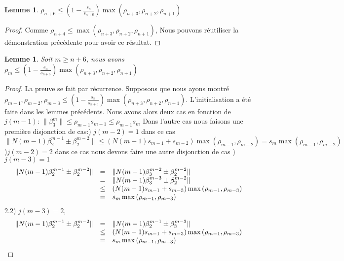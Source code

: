 \documentclass[12pt]{article}
\theoremstyle{plain}%
\newtheorem{lem}[thm]{Lemme}
\theoremstyle{definition}
\theoremstyle{remark}
\begin{document}
\begin{lem}
$\rho_{n+6} \leq (1-\frac{s_n}{s_{n+6}})\max{(\rho_{n+3},\rho_{n+2},\rho_{n+1})}$
\end{lem}
\begin{proof}
Comme $\rho_{n+4} \leq \max{(\rho_{n+3},\rho_{n+2},\rho_{n+1})}$, Nous pouvons réutiliser la démonstration précédente pour avoir ce résultat.
\end{proof}
\begin{lem}
Soit $m \geq n+6$, nous avons $\rho_m \leq (1-\frac{s_n}{s_{n+6}})\max{(\rho_{n+3},\rho_{n+2},\rho_{n+1})}$
\end{lem}
\begin{proof}
La preuve se fait par récurrence. Supposons que nous ayons montré $\rho_{m-1},\rho_{m-2},\rho_{m-3} \leq (1-\frac{s_n}{s_{n+6}})\max{(\rho_{n+3},\rho_{n+2},\rho_{n+1})}$. L'initialisation a été faite dans les lemmes précédents. Nous avons alors deux cas en fonction de $j(m-1)$: \newline
$\| \beta_3^{m} \| \leq \rho_{m-1} s_{m-1} \leq \rho_{m-1} s_m$ \newline
Dans l'autre cas nous faisons une première disjonction de cas:) $j(m-2)=1$ dans ce cas $\|N(m-1)\beta_2^{m-1} \pm \beta_2^{m-2}\| \leq (N(m-1)s_{m-1}+s_{m-2}) \max{(\rho_{m-1},\rho_{m-2})}=s_m \max{(\rho_{m-1},\rho_{m-2})}$)$j(m-2)=2$ dans ce cas nous devons faire une autre disjonction de cas )$j(m-3)=1$
\[
\begin{array}{c c l}
\|N(m-1)\beta_2^{m-1} \pm \beta_2^{m-2}\| & = & \|N(m-1)\beta_3^{m-2} \pm \beta_2^{m-2}\| \\
& = & \|N(m-1)\beta_3^{m-3} \pm \beta_2^{m-2}\| \\
& \leq & (N(m-1)s_{m-1}+s_{m-3}) \max{(\rho_{m-1},\rho_{m-3})} \\
& = & s_m \max{(\rho_{m-1},\rho_{m-3})}
\end{array}
\]
2.2) $j(m-3)=2$,
\[
\begin{array}{c c l}
\|N(m-1)\beta_2^{m-1} \pm \beta_2^{m-2}\| & = & \|N(m-1)\beta_2^{m-1} \pm \beta_3^{m-3}\| \\
& \leq & (N(m-1)s_{m-1}+s_{m-3})\max{(\rho_{m-1},\rho_{m-3})} \\
& = & s_m \max{(\rho_{m-1},\rho_{m-3})}
\end{array}
\]
\end{proof}
\end{document}
